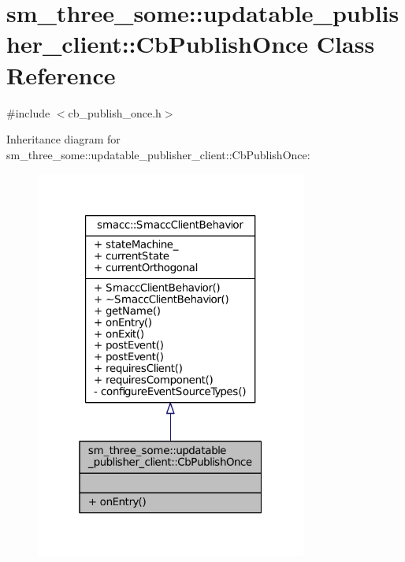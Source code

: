 \hypertarget{classsm__three__some_1_1updatable__publisher__client_1_1CbPublishOnce}{}\section{sm\+\_\+three\+\_\+some\+:\+:updatable\+\_\+publisher\+\_\+client\+:\+:Cb\+Publish\+Once Class Reference}
\label{classsm__three__some_1_1updatable__publisher__client_1_1CbPublishOnce}


{\ttfamily \#include $<$cb\+\_\+publish\+\_\+once.\+h$>$}



Inheritance diagram for sm\+\_\+three\+\_\+some\+:\+:updatable\+\_\+publisher\+\_\+client\+:\+:Cb\+Publish\+Once\+:
\nopagebreak
\begin{figure}[H]
\begin{center}
\leavevmode
\includegraphics[width=253pt]{classsm__three__some_1_1updatable__publisher__client_1_1CbPublishOnce__inherit__graph}
\end{center}
\end{figure}


